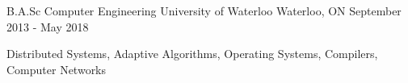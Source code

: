 

\begin{cventries}

  \cventry
    {B.A.Sc Computer Engineering} %
    {University of Waterloo} %
    {Waterloo, ON} %
    {September 2013 - May 2018} %
    {
      \begin{cvitems} %
      \item {Distributed Systems, Adaptive Algorithms, Operating Systems, Compilers, Computer Networks}
      \end{cvitems}
    }

\end{cventries}
